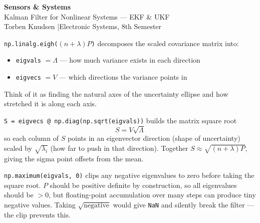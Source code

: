 \documentclass[12pt, a4paper]{article}
\begin{document}
\begin{center}
  {\LARGE\bfseries\color{headernavy} Sensors \& Systems}\\[4pt]
  {\large Kalman Filter for Nonlinear Systems --- EKF \& UKF}\\[2pt]
  {\normalsize Torben Knudsen \quad|\quad Electronic Systems, 8th Semester}
\end{center}

\texttt{np.linalg.eigh($(n+\lambda)P$)} decomposes the scaled covariance matrix into:
\begin{itemize}[leftmargin=1.4em]
    \item \texttt{eigvals} $= \Lambda$ --- how much variance exists in each direction
    \item \texttt{eigvecs} $= V$ --- which directions the variance points in
\end{itemize}
Think of it as finding the natural axes of the uncertainty ellipse and how stretched it is along each axis.

\texttt{S = eigvecs @ np.diag(np.sqrt(eigvals))} builds the matrix square root
\[
  S = V\sqrt{\Lambda}
\]
so each column of $S$ points in an eigenvector direction (shape of uncertainty)
scaled by $\sqrt{\lambda_i}$ (how far to push in that direction).
Together $S \approx \sqrt{(n+\lambda)P}$, giving the sigma point offsets from the mean.

\begin{notebox}
  \texttt{np.maximum(eigvals, 0)} clips any negative eigenvalues to zero before
  taking the square root. $P$ should be positive definite by construction, so all
  eigenvalues should be $> 0$, but floating-point accumulation over many steps can
  produce tiny negative values. Taking $\sqrt{\text{negative}}$ would give \texttt{NaN}
  and silently break the filter --- the clip prevents this.
\end{notebox}
\end{document}
